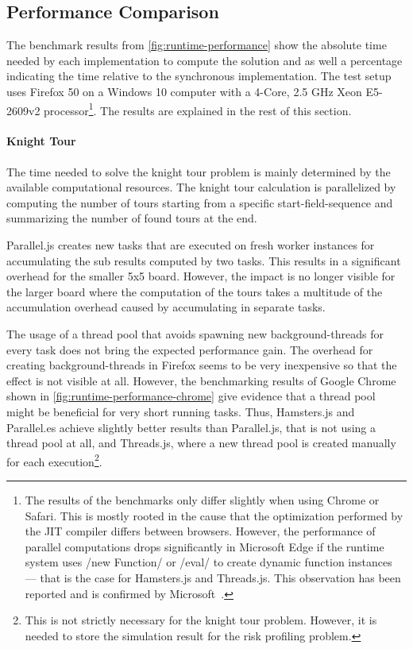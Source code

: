\subsection{Performance Comparison}
The benchmark results from \cref{fig:runtime-performance} show the absolute time needed by each implementation to compute the solution and as well a percentage indicating the time relative to the synchronous implementation. The test setup uses Firefox 50 on a Windows 10 computer with a 4-Core, 2.5 GHz Xeon E5-2609v2 processor\footnote{The results of the benchmarks only differ slightly when using Chrome or Safari. This is mostly rooted in the cause that the optimization performed by the JIT compiler differs between browsers. However, the performance of parallel computations drops significantly in Microsoft Edge if the runtime system uses \javascriptinline/new Function/ or \javascriptinline/eval/ to create dynamic function instances --- that is the case for Hamsters.js and Threads.js. This observation has been reported and is confirmed by Microsoft~\cite{newFunctionWebWorkerEdge}.}. The results are explained in the rest of this section.

\begin{figure*}
		
	\caption{Runtime Performance of Parallelization Problems Relative to Synchronously Execution}
	\label{fig:runtime-performance}
\end{figure*}


\paragraph{Knight Tour} The time needed to solve the knight tour problem is mainly determined by the available computational resources. The knight tour calculation is parallelized by computing the number of tours starting from a specific start-field-sequence and summarizing the  number of found tours at the end. 

Parallel.js creates new tasks that are executed on fresh worker instances for accumulating the sub results computed by two tasks. This results in a significant overhead for the smaller 5x5 board. However, the impact is no longer visible for the larger board where the computation of the tours takes a multitude of the accumulation overhead caused by accumulating in separate tasks.

The usage of a thread pool that avoids spawning new background-threads for every task does not bring the expected performance gain. The overhead for creating background-threads in Firefox seems to be very inexpensive so that the effect is not visible at all. However, the benchmarking results of Google Chrome shown in \cref{fig:runtime-performance-chrome} give evidence that a thread pool might be beneficial for very short running tasks. Thus, Hamsters.js and Parallel.es achieve slightly better results than Parallel.js, that is not using a thread pool at all, and Threads.js, where a new thread pool is created manually for each execution\footnote{This is not strictly necessary for the knight tour problem. However, it is needed to store the simulation result for the risk profiling problem.}. 

